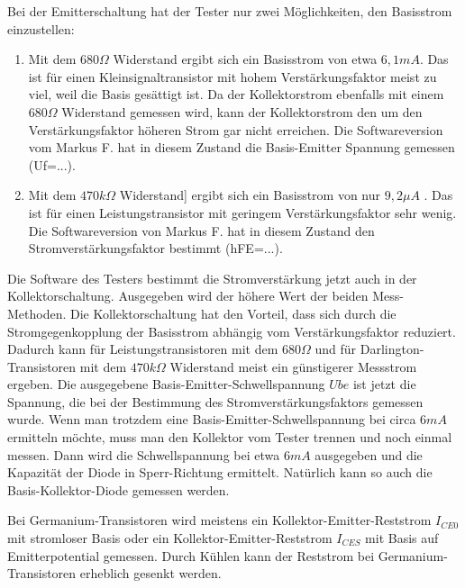 Bei der Emitterschaltung hat der Tester nur zwei Möglichkeiten, den Basisstrom einzustellen:
\begin{enumerate}
\item Mit dem \(680\Omega\) Widerstand ergibt sich ein Basisstrom von etwa \(6,1mA\). Das ist für einen
Kleinsignaltransistor mit hohem Verstärkungsfaktor meist zu viel, weil die Basis gesättigt ist.
Da der Kollektorstrom ebenfalls mit einem \(680\Omega\) Widerstand gemessen wird, kann der Kollektorstrom
den um den Verstärkungsfaktor höheren Strom gar nicht erreichen. Die Softwareversion vom Markus F. hat
in diesem Zustand die Basis-Emitter Spannung gemessen (Uf=...).\\
\item Mit dem \(470k\Omega\) Widerstand] ergibt sich ein Basisstrom von nur \(9,2\mu A\) .
Das ist für einen Leistungstransistor mit geringem Verstärkungsfaktor sehr wenig.
Die Softwareversion von Markus F. hat in diesem Zustand den Stromverstärkungsfaktor bestimmt (hFE=...).\\
\end{enumerate}

Die Software des Testers bestimmt die Stromverstärkung jetzt auch in der Kollektorschaltung.
Ausgegeben wird der höhere Wert der beiden Mess-Methoden.
Die Kollektorschaltung hat den Vorteil, dass sich durch die Stromgegenkopplung der Basisstrom abhängig vom
Verstärkungsfaktor reduziert. Dadurch kann für Leistungstransistoren mit dem \(680\Omega\) und für Darlington-Transistoren
mit dem \(470k\Omega\) Widerstand meist ein günstigerer Messstrom ergeben.
Die ausgegebene Basis-Emitter-Schwellspannung \(Ube\) ist jetzt die Spannung,
die bei der Bestimmung des Stromverstärkungsfaktors gemessen wurde.
Wenn man trotzdem eine Basis-Emitter-Schwellspannung bei circa \(6mA\) ermitteln möchte, muss man den Kollektor
vom Tester trennen und noch einmal messen.
Dann wird die Schwellspannung bei etwa \(6mA\) ausgegeben und die Kapazität der Diode in Sperr-Richtung ermittelt.
Natürlich kann so auch die Basis-Kollektor-Diode gemessen werden.

Bei Germanium-Transistoren wird meistens ein Kollektor-Emitter-Reststrom \(I_{CE0}\) mit stromloser Basis oder
ein Kollektor-Emitter-Reststrom \(I_{CES}\) mit Basis auf Emitterpotential gemessen.
Durch Kühlen kann der Reststrom bei Germanium-Transistoren erheblich gesenkt werden. 

